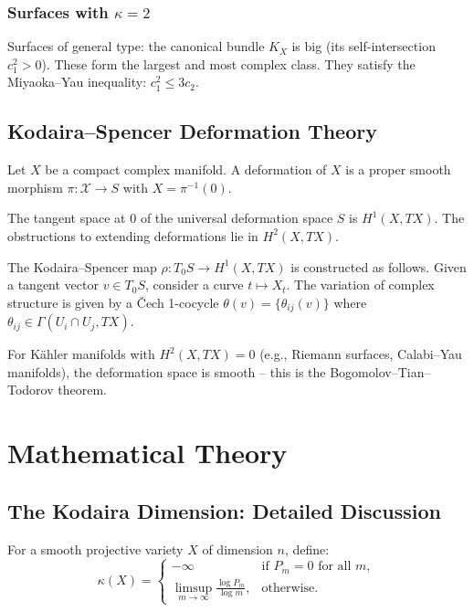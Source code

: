 \subsubsection*{Surfaces with $\kappa = 2$}
Surfaces of general type: the canonical bundle $K_X$ is big (its self-intersection $c_1^2 > 0$). These form the largest and most complex class. They satisfy the Miyaoka--Yau inequality: $c_1^2 \leq 3c_2$.

\subsection{Kodaira--Spencer Deformation Theory}

Let $X$ be a compact complex manifold. A deformation of $X$ is a proper smooth morphism $\pi: \mathcal{X} \to S$ with $X = \pi^{-1}(0)$.

\begin{theorem}
The tangent space at $0$ of the universal deformation space $S$ is $H^1(X, TX)$. The obstructions to extending deformations lie in $H^2(X, TX)$.
\end{theorem}

The Kodaira--Spencer map $\rho: T_0 S \to H^1(X, TX)$ is constructed as follows. Given a tangent vector $v \in T_0 S$, consider a curve $t \mapsto X_t$. The variation of complex structure is given by a Čech 1-cocycle $\theta(v) = \{\theta_{ij}(v)\}$ where $\theta_{ij} \in \Gamma(U_i \cap U_j, TX)$.

For K\"{a}hler manifolds with $H^2(X, TX) = 0$ (e.g., Riemann surfaces, Calabi--Yau manifolds), the deformation space is smooth -- this is the Bogomolov--Tian--Todorov theorem.

\section{Mathematical Theory}

\subsection{The Kodaira Dimension: Detailed Discussion}

For a smooth projective variety $X$ of dimension $n$, define:
\[
\kappa(X) = 
\begin{cases}
-\infty & \text{if } P_m = 0 \text{ for all } m, \\
\limsup_{m \to \infty} \frac{\log P_m}{\log m}, & \text{otherwise}.
\end{cases}
\]


